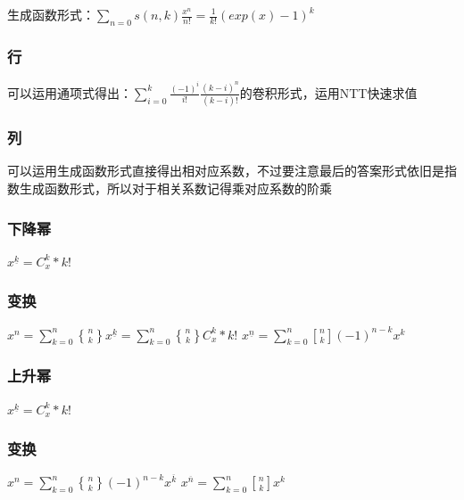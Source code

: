 \documentclass[12pt, a4paper, oneside]{ctexart}
\begin{document}
生成函数形式：${\sum_{n=0}}{s(n,k){\frac{x^n}{n!}}}={\frac{1}{k!}}{(exp(x)-1)^k}$
\subsubsection{行}
可以运用通项式得出：${{\sum_{i=0}^k}{\frac{(-1)^i}{i!}}}{\frac{(k-i)^n}{(k-i)!}}$的卷积形式，运用NTT快速求值
\subsubsection{列}
可以运用生成函数形式直接得出相对应系数，不过要注意最后的答案形式依旧是指数生成函数形式，所以对于相关系数记得乘对应系数的阶乘

\subsubsection{下降幂}
$x^{\underline{k}}={C_x^k*k!}$

\subsubsection{变换}
${{x^n}={\sum_{k=0}^n} {n \brace k}{x^{\underline{k}}}={\sum_{k=0}^n}{n \brace k}{C_x^k*k!}}$
${x^{\underline{n}}={\sum_{k=0}^n}{n \brack k}{(-1)^{n-k}}{x^k}}$

\subsubsection{上升幂}
$x^{\underline{k}}={C_x^k*k!}$

\subsubsection{变换}
${{x^n}={\sum_{k=0}^n}{n \brace k}{(-1)^{n-k}}{x^{\overline{k}}}}$
${{x^{\overline{n}}}={\sum_{k=0}^n}{n\brack k}{x^k}}$

\newpage 
\end{document}
